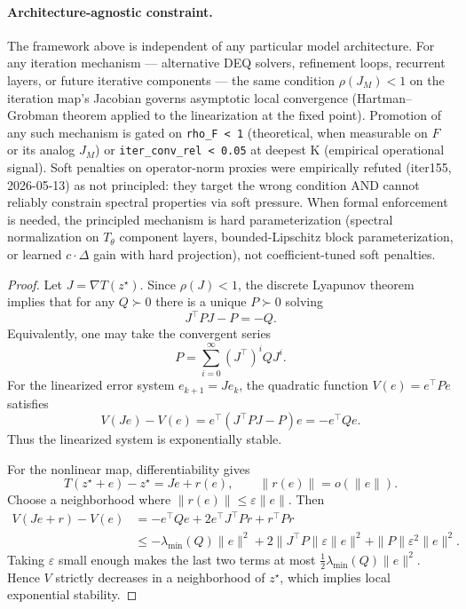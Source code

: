 \documentclass[11pt]{article}
\begin{document}
\paragraph{Architecture-agnostic constraint.}
The framework above is independent of any particular model architecture.
For any iteration mechanism --- alternative DEQ solvers, refinement
loops, recurrent layers, or future iterative components --- the same
condition $\rho(J_M)<1$ on the iteration map's Jacobian governs
asymptotic local convergence (Hartman--Grobman theorem applied to the
linearization at the fixed point).  Promotion of any such mechanism is
gated on \texttt{rho\_F < 1} (theoretical, when measurable on $F$ or its
analog $J_M$) or \texttt{iter\_conv\_rel < 0.05} at deepest K
(empirical operational signal).  Soft penalties on operator-norm
proxies were empirically refuted (iter155, 2026-05-13) as not
principled: they target the wrong condition AND cannot reliably
constrain spectral properties via soft pressure.  When formal
enforcement is needed, the principled mechanism is hard
parameterization (spectral normalization on $T_\theta$ component
layers, bounded-Lipschitz block parameterization, or learned
$c\cdot\Delta$ gain with hard projection), not coefficient-tuned soft
penalties.

\begin{proof}
Let $J=\nabla T(z^\star)$.  Since $\rho(J)<1$, the discrete Lyapunov theorem
implies that for any $Q\succ0$ there is a unique $P\succ0$ solving
\[
  J^\top P J-P=-Q.
\]
Equivalently, one may take the convergent series
\[
  P=\sum_{i=0}^{\infty}(J^\top)^i QJ^i .
\]
For the linearized error system $e_{k+1}=Je_k$, the quadratic function
$V(e)=e^\top Pe$ satisfies
\[
  V(Je)-V(e)=e^\top(J^\top PJ-P)e=-e^\top Qe.
\]
Thus the linearized system is exponentially stable.

For the nonlinear map, differentiability gives
\[
  T(z^\star+e)-z^\star = Je+r(e),
  \qquad
  \|r(e)\|=o(\|e\|).
\]
Choose a neighborhood where $\|r(e)\|\le\varepsilon\|e\|$.  Then
\[
\begin{aligned}
  V(Je+r)-V(e)
    &= -e^\top Qe + 2e^\top J^\top Pr + r^\top Pr \\
    &\le -\lambda_{\min}(Q)\|e\|^2
      +2\|J^\top P\|\varepsilon\|e\|^2
      +\|P\|\varepsilon^2\|e\|^2 .
\end{aligned}
\]
Taking $\varepsilon$ small enough makes the last two terms at most
$\frac12\lambda_{\min}(Q)\|e\|^2$.  Hence $V$ strictly decreases in a
neighborhood of $z^\star$, which implies local exponential stability.
\end{proof}
\end{document}
